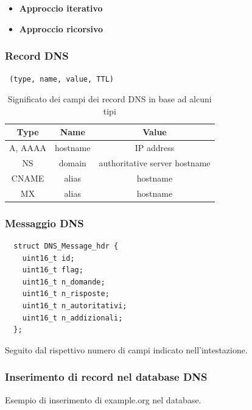 \documentclass[12pt,a4paper]{article}
\begin{document}
\begin{itemize}
  \item \textbf{Approccio iterativo}
  \item \textbf{Approccio ricorsivo}
\end{itemize}

\subsubsection{Record DNS}
\texttt{ (type, name, value, TTL) }

\begin{table}[H]
  \centering
  \begin{tabular}{| c | c | c |}\hline
    Type      & Name      & Value                           \\ \hline
    A, AAAA   & hostname  & IP address                      \\ \hline
    NS        & domain    & authoritative server hostname   \\ \hline
    CNAME     & alias     & hostname                        \\ \hline
    MX        & alias     & hostname                        \\ \hline
  \end{tabular}
  \caption{Significato dei campi dei record DNS in base ad alcuni tipi}
\end{table}

\subsubsection{Messaggio DNS}
\begin{verbatim}
  struct DNS_Message_hdr {
    uint16_t id;
    uint16_t flag;
    uint16_t n_domande;
    uint16_t n_risposte;
    uint16_t n_autoritativi;
    uint16_t n_addizionali;
  };
\end{verbatim}
Seguito dal rispettivo numero di campi indicato nell'intestazione.

\subsubsection{Inserimento di record nel database DNS}
Esempio di inserimento di example.org nel database.
\end{document}
